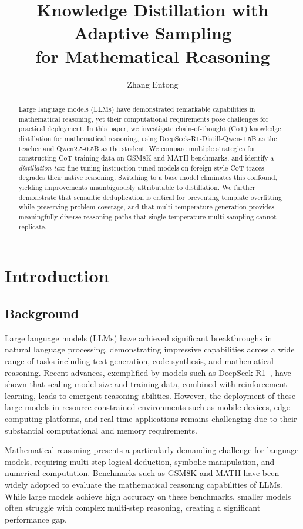 \documentclass{article}
\title{Knowledge Distillation with Adaptive Sampling\\for Mathematical Reasoning}
\author{
  Zhang Entong
}
\begin{document}
\maketitle


\begin{abstract}
Large language models (LLMs) have demonstrated remarkable capabilities in mathematical reasoning, yet their computational requirements pose challenges for practical deployment. In this paper, we investigate chain-of-thought (CoT) knowledge distillation for mathematical reasoning, using DeepSeek-R1-Distill-Qwen-1.5B as the teacher and Qwen2.5-0.5B as the student. We compare multiple strategies for constructing CoT training data on GSM8K and MATH benchmarks, and identify a \textit{distillation tax}: fine-tuning instruction-tuned models on foreign-style CoT traces degrades their native reasoning. Switching to a base model eliminates this confound, yielding improvements unambiguously attributable to distillation. We further demonstrate that semantic deduplication is critical for preventing template overfitting while preserving problem coverage, and that multi-temperature generation provides meaningfully diverse reasoning paths that single-temperature multi-sampling cannot replicate.
\end{abstract}


\section{Introduction}

\subsection{Background}

Large language models (LLMs) have achieved significant breakthroughs in natural language processing, demonstrating impressive capabilities across a wide range of tasks including text generation, code synthesis, and mathematical reasoning. Recent advances, exemplified by models such as DeepSeek-R1~\cite{deepseek2025r1}, have shown that scaling model size and training data, combined with reinforcement learning, leads to emergent reasoning abilities. However, the deployment of these large models in resource-constrained environments-such as mobile devices, edge computing platforms, and real-time applications-remains challenging due to their substantial computational and memory requirements.

Mathematical reasoning presents a particularly demanding challenge for language models, requiring multi-step logical deduction, symbolic manipulation, and numerical computation. Benchmarks such as GSM8K and MATH have been widely adopted to evaluate the mathematical reasoning capabilities of LLMs. While large models achieve high accuracy on these benchmarks, smaller models often struggle with complex multi-step reasoning, creating a significant performance gap.
\end{document}
